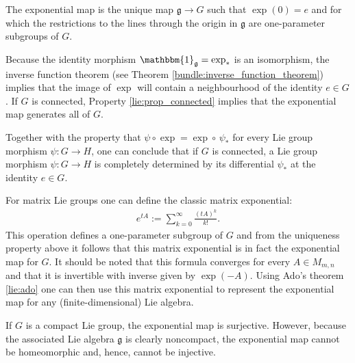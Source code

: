     \begin{property}[Uniqueness]
        The exponential map is the unique map $\mathfrak{g}\rightarrow G$ such that $\exp(0) = e$ and for which the restrictions to the lines through the origin in $\mathfrak{g}$ are one-parameter subgroups of $G$.
    \end{property}
    \begin{result}\label{lie:exp_result}
        Because the identity morphism $\mathbbm{1}_\mathfrak{g}=\exp_\ast$ is an isomorphism, the inverse function theorem (see Theorem \ref{bundle:inverse_function_theorem}) implies that the image of $\exp$ will contain a neighbourhood of the identity $e\in G$. If $G$ is connected, Property \ref{lie:prop_connected} implies that the exponential map generates all of $G$.

        Together with the property that $\psi\circ\exp = \exp\circ\,\psi_\ast$ for every Lie group morphism $\psi:G\rightarrow H$, one can conclude that if $G$ is connected, a Lie group morphism $\psi:G\rightarrow H$ is completely determined by its differential $\psi_\ast$ at the identity $e\in G$.
    \end{result}

    \begin{example}
        For matrix Lie groups one can define the classic matrix exponential:
        \begin{gather}
            e^{tA} := \sum_{k=0}^\infty\frac{(tA)^k}{k!}.
        \end{gather}
        This operation defines a one-parameter subgroup of $G$ and from the uniqueness property above it follows that this matrix exponential is in fact the exponential map for $G$. It should be noted that this formula converges for every $A\in M_{m,n}$ and that it is invertible with inverse given by $\exp(-A)$. Using Ado's theorem \ref{lie:ado} one can then use this matrix exponential to represent the exponential map for any (finite-dimensional) Lie algebra.
    \end{example}
    \begin{remark}
        If $G$ is a compact Lie group, the exponential map is surjective. However, because the associated Lie algebra $\mathfrak{g}$ is clearly noncompact, the exponential map cannot be homeomorphic and, hence, cannot be injective.
    \end{remark}

